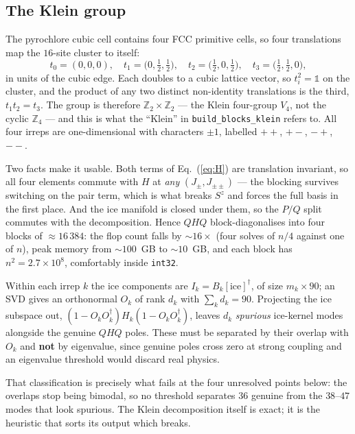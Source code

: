 \documentclass[11pt]{article}
\newcommand{\Jpm}{J_{\pm}}
\newcommand{\Jpmpm}{J_{\pm\pm}}
\begin{document}
\subsection{The Klein group}

The pyrochlore cubic cell contains four FCC primitive cells, so four
translations map the $16$-site cluster to itself:
\begin{equation}
t_0=(0,0,0),\quad t_1=\bigl(0,\tfrac12,\tfrac12\bigr),\quad
t_2=\bigl(\tfrac12,0,\tfrac12\bigr),\quad
t_3=\bigl(\tfrac12,\tfrac12,0\bigr),
\end{equation}
in units of the cubic edge.  Each doubles to a cubic lattice vector, so
$t_i^2=\mathbb{1}$ on the cluster, and the product of any two distinct
non-identity translations is the third, $t_1t_2=t_3$.  The group is
therefore $\mathbb{Z}_2\times\mathbb{Z}_2$ --- the Klein four-group $V_4$,
not the cyclic $\mathbb{Z}_4$ --- and this is what the ``Klein'' in
\texttt{build\_blocks\_klein} refers to.  All four irreps are
one-dimensional with characters $\pm1$, labelled $++$, $+-$, $-+$, $--$.

Two facts make it usable.  Both terms of Eq.~(\ref{eq:H}) are translation
invariant, so all four elements commute with $H$ at \emph{any}
$(\Jpm,\Jpmpm)$ --- the blocking survives switching on the pair term, which
is what breaks $S^z$ and forces the full basis in the first place.  And the
ice manifold is closed under them, so the $P/Q$ split commutes with the
decomposition.  Hence $QHQ$ block-diagonalises into four blocks of
$\approx16\,384$: the flop count falls by $\sim16\times$ (four solves of
$n/4$ against one of $n$), peak memory from $\sim100$~GB to $\sim10$~GB,
and each block has $n^2=2.7\times10^8$, comfortably inside \texttt{int32}.

Within each irrep $k$ the ice components are $I_k=B_k[\text{ice}]^\dagger$,
of size $m_k\times90$; an SVD gives an orthonormal $O_k$ of rank $d_k$ with
$\sum_k d_k=90$.  Projecting the ice subspace out,
$(1-O_kO_k^\dagger)H_k(1-O_kO_k^\dagger)$, leaves $d_k$ \emph{spurious}
ice-kernel modes alongside the genuine $QHQ$ poles.  These must be
separated by their overlap with $O_k$ and \textbf{not} by eigenvalue, since
genuine poles cross zero at strong coupling and an eigenvalue threshold
would discard real physics.

That classification is precisely what fails at the four unresolved points
below: the overlaps stop being bimodal, so no threshold separates $36$
genuine from the $38$--$47$ modes that look spurious.  The Klein
decomposition itself is exact; it is the heuristic that sorts its output
which breaks.
\end{document}
